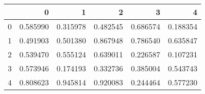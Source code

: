 \begin{tabular}{lrrrrr}
\toprule
{} &         0 &         1 &         2 &         3 &         4 \\
\midrule
0 &  0.585990 &  0.315978 &  0.482545 &  0.686574 &  0.188354 \\
1 &  0.491903 &  0.501380 &  0.867948 &  0.786540 &  0.635847 \\
2 &  0.539470 &  0.555124 &  0.639011 &  0.226587 &  0.107231 \\
3 &  0.573946 &  0.174193 &  0.332736 &  0.385004 &  0.543743 \\
4 &  0.808623 &  0.945814 &  0.920083 &  0.244464 &  0.577230 \\
\bottomrule
\end{tabular}
